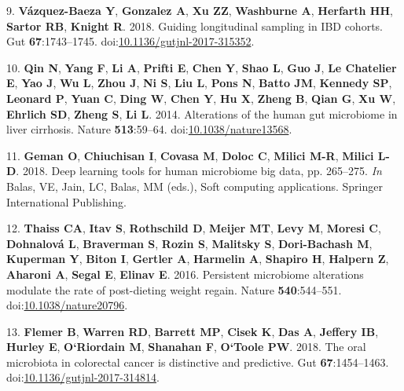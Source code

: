 \documentclass[11pt,]{article}
\begin{document}
\hypertarget{ref-vazquez-baeza_guiding_2018}{}
9. \textbf{Vázquez-Baeza Y}, \textbf{Gonzalez A}, \textbf{Xu ZZ},
\textbf{Washburne A}, \textbf{Herfarth HH}, \textbf{Sartor RB},
\textbf{Knight R}. 2018. Guiding longitudinal sampling in IBD cohorts.
Gut \textbf{67}:1743--1745.
doi:\href{https://doi.org/10.1136/gutjnl-2017-315352}{10.1136/gutjnl-2017-315352}.

\hypertarget{ref-qin_alterations_2014}{}
10. \textbf{Qin N}, \textbf{Yang F}, \textbf{Li A}, \textbf{Prifti E},
\textbf{Chen Y}, \textbf{Shao L}, \textbf{Guo J}, \textbf{Le Chatelier
E}, \textbf{Yao J}, \textbf{Wu L}, \textbf{Zhou J}, \textbf{Ni S},
\textbf{Liu L}, \textbf{Pons N}, \textbf{Batto JM}, \textbf{Kennedy SP},
\textbf{Leonard P}, \textbf{Yuan C}, \textbf{Ding W}, \textbf{Chen Y},
\textbf{Hu X}, \textbf{Zheng B}, \textbf{Qian G}, \textbf{Xu W},
\textbf{Ehrlich SD}, \textbf{Zheng S}, \textbf{Li L}. 2014. Alterations
of the human gut microbiome in liver cirrhosis. Nature
\textbf{513}:59--64.
doi:\href{https://doi.org/10.1038/nature13568}{10.1038/nature13568}.

\hypertarget{ref-geman_deep_2018}{}
11. \textbf{Geman O}, \textbf{Chiuchisan I}, \textbf{Covasa M},
\textbf{Doloc C}, \textbf{Milici M-R}, \textbf{Milici L-D}. 2018. Deep
learning tools for human microbiome big data, pp. 265--275. \emph{In}
Balas, VE, Jain, LC, Balas, MM (eds.), Soft computing applications.
Springer International Publishing.

\hypertarget{ref-thaiss_persistent_2016}{}
12. \textbf{Thaiss CA}, \textbf{Itav S}, \textbf{Rothschild D},
\textbf{Meijer MT}, \textbf{Levy M}, \textbf{Moresi C},
\textbf{Dohnalová L}, \textbf{Braverman S}, \textbf{Rozin S},
\textbf{Malitsky S}, \textbf{Dori-Bachash M}, \textbf{Kuperman Y},
\textbf{Biton I}, \textbf{Gertler A}, \textbf{Harmelin A},
\textbf{Shapiro H}, \textbf{Halpern Z}, \textbf{Aharoni A},
\textbf{Segal E}, \textbf{Elinav E}. 2016. Persistent microbiome
alterations modulate the rate of post-dieting weight regain. Nature
\textbf{540}:544--551.
doi:\href{https://doi.org/10.1038/nature20796}{10.1038/nature20796}.

\hypertarget{ref-flemer_oral_2018}{}
13. \textbf{Flemer B}, \textbf{Warren RD}, \textbf{Barrett MP},
\textbf{Cisek K}, \textbf{Das A}, \textbf{Jeffery IB}, \textbf{Hurley
E}, \textbf{O`Riordain M}, \textbf{Shanahan F}, \textbf{O`Toole PW}.
2018. The oral microbiota in colorectal cancer is distinctive and
predictive. Gut \textbf{67}:1454--1463.
doi:\href{https://doi.org/10.1136/gutjnl-2017-314814}{10.1136/gutjnl-2017-314814}.
\end{document}
